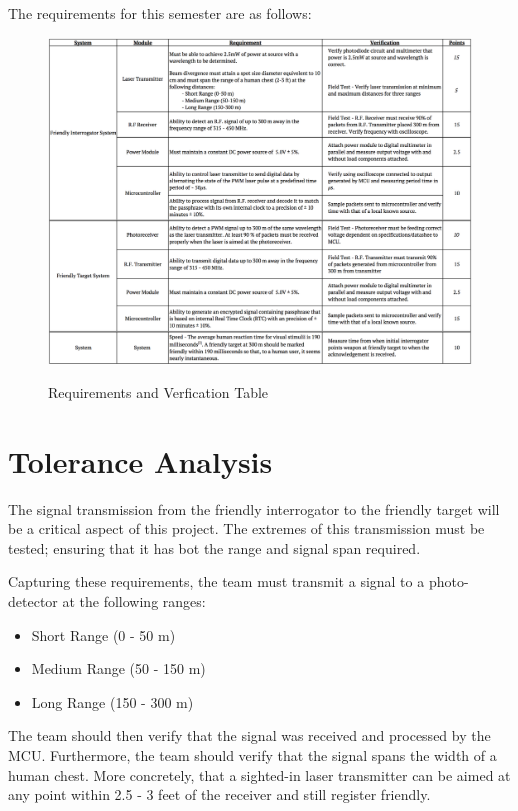 \documentclass[openbib,letterpaper,10pt]{article}
\begin{document}
\begin{spacing}{1.15}
The requirements for this semester are as follows: 
\begin{figure} [H]
	\centering
	\includegraphics[scale=0.5]{Requirements-Verification-Table.png}
	\label{fig:brequirements-table}
	\caption{Requirements and Verfication Table}
\end{figure}

\section{Tolerance Analysis}
The signal transmission from the friendly interrogator to the friendly target will be a critical aspect of this project. The extremes of this transmission must be tested; ensuring that it has bot the range and signal span required. 

Capturing these requirements, the team must transmit a signal to a photo-detector at the following ranges:
		\begin{itemize}
			\item Short Range (0 - 50 m)
			\item Medium Range (50 - 150 m)
			\item Long Range (150 - 300 m)
		\end{itemize}

The team should then verify that the signal was received and processed by the MCU. Furthermore, the team should verify that the signal spans the width of a human chest. More concretely, that a sighted-in laser transmitter can be aimed at any point within 2.5 - 3 feet of the receiver and still register friendly. 


\end{spacing}
\end{document}
